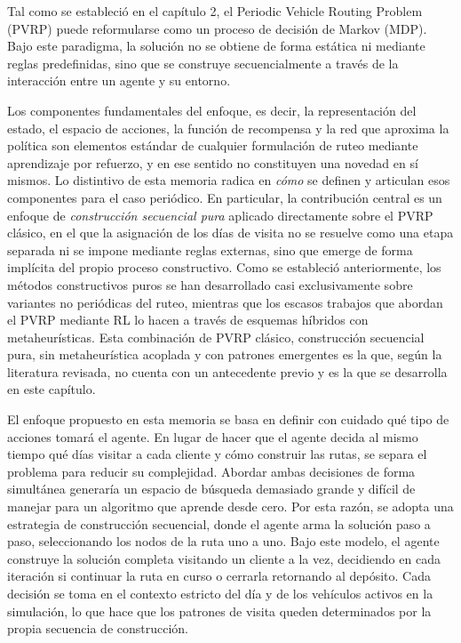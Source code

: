 
Tal como se estableció en el capítulo 2, el Periodic Vehicle Routing Problem (PVRP) puede reformularse como un proceso de decisión de Markov (MDP). Bajo este paradigma, la solución no se obtiene de forma estática ni mediante reglas predefinidas, sino que se construye secuencialmente a través de la interacción entre un agente y su entorno.

Los componentes fundamentales del enfoque, es decir, la representación del estado, el espacio de acciones, la función de recompensa y la red que aproxima la política son elementos estándar de cualquier formulación de ruteo mediante aprendizaje por refuerzo, y en ese sentido no constituyen una novedad en sí mismos. Lo distintivo de esta memoria radica en \textit{cómo} se definen y articulan esos componentes para el caso periódico. En particular, la contribución central es un enfoque de \textit{construcción secuencial pura} aplicado directamente sobre el PVRP clásico, en el que la asignación de los días de visita no se resuelve como una etapa separada ni se impone mediante reglas externas, sino que emerge de forma implícita del propio proceso constructivo. Como se estableció anteriormente, los métodos constructivos puros se han desarrollado casi exclusivamente sobre variantes no periódicas del ruteo, mientras que los escasos trabajos que abordan el PVRP mediante RL lo hacen a través de esquemas híbridos con metaheurísticas. Esta combinación de PVRP clásico, construcción secuencial pura, sin metaheurística acoplada y con patrones emergentes es la que, según la literatura revisada, no cuenta con un antecedente previo y es la que se desarrolla en este capítulo.

El enfoque propuesto en esta memoria se basa en definir con cuidado qué tipo de acciones tomará el agente. En lugar de hacer que el agente decida al mismo tiempo qué días visitar a cada cliente y cómo construir las rutas, se separa el problema para reducir su complejidad. Abordar ambas decisiones de forma simultánea generaría un espacio de búsqueda demasiado grande y difícil de manejar para un algoritmo que aprende desde cero. Por esta razón, se adopta una estrategia de construcción secuencial, donde el agente arma la solución paso a paso, seleccionando los nodos de la ruta uno a uno. Bajo este modelo, el agente construye la solución completa visitando un cliente a la vez, decidiendo en cada iteración si continuar la ruta en curso o cerrarla retornando al depósito. Cada decisión se toma en el contexto estricto del día y de los vehículos activos en la simulación, lo que hace que los patrones de visita queden determinados por la propia secuencia de construcción.

